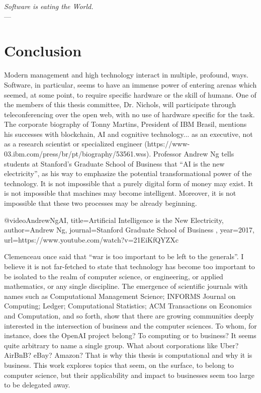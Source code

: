 \begin{flushright}{\slshape
	Software is eating the World.} \\ \medskip
    --- \citep{andreesen:2011}
\end{flushright}
\bigskip

\chapter{Conclusion}
\bigskip

\noindent Modern management and high technology interact in multiple, profound, ways.  Software, in particular, seems to have an immense power of entering arenas which seemed, at some point, to require specific hardware or the skill of humans.  One of the members of this thesis committee, Dr. Nichols, will participate through teleconferencing over the open web, with no use of hardware specific for the task.  The corporate biography of Tonny Martins, President of IBM Brasil, mentions his successes with blockchain, AI and cognitive technology... as an executive, not as a research scientist or specialized engineer (https://www-03.ibm.com/press/br/pt/biography/53561.wss). Professor Andrew Ng tells students at Stanford’s Graduate School of Business that “AI is the new electricity”, as his way to emphasize the potential transformational power of the technology.  It is not impossible that a purely digital form of money may exist.  It is not impossible that machines may become intelligent.  Moreover, it is not impossible that these two processes may be already beginning.  

@video{AndrewNgAI, 
  title={Artificial Intelligence is the New Electricity},
  author={Andrew Ng},
  journal={Stanford Graduate School of Business },
  year={2017},
  url={https://www.youtube.com/watch?v=21EiKfQYZXc}
}

Clemenceau once said that “war is too important to be left to the generals”.  I believe it is not far-fetched to state that technology has become too important to be isolated to the realm of computer science, or engineering, or applied mathematics, or any single discipline.  The emergence of scientific journals with names such as Computational Management Science; INFORMS Journal on Computing; Ledger; Computational Statistics; ACM Transactions on Economics and Computation, and so forth, show that there are growing communities deeply interested in the intersection of business and the computer sciences.  To whom, for instance, does the OpenAI project belong?  To computing or to business?  It seems quite arbitrary to name a single group. What about corporations like Uber?  AirBnB?  eBay?  Amazon? That is why this thesis is computational and why it is business.  This work explores topics that seem, on the surface, to belong to computer science, but their applicability and impact to businesses seem too large to be delegated away.  


